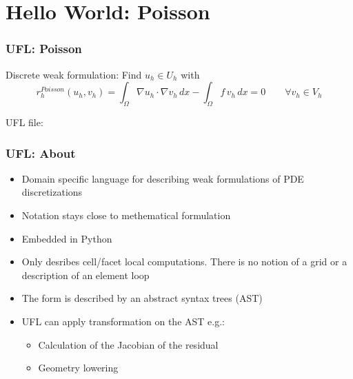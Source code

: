\documentclass[ignorenonframetext,11pt]{beamer}
\theoremstyle{definition}
\begin{document}
\section{Hello World: Poisson}

\begin{frame}
  \frametitle{UFL: Poisson}
  Discrete weak formulation: Find $u_h \in U_h$ with
  \begin{equation*}
    r_h^{Poisson}(u_h, v_h) = \int_\Omega \nabla u_h \cdot \nabla v_h \, dx
    - \int_\Omega f \, v_h \, dx = 0 \qquad \forall v_h \in V_h
  \end{equation*}

  UFL file:
  
\end{frame}

\begin{frame}
  \frametitle{UFL: About}
  \begin{itemize}
  \item Domain specific language for describing weak formulations of PDE
    discretizations
  \item Notation stays close to methematical formulation
  \item Embedded in Python
  \item Only desribes cell/facet local computations. There is no notion of a
    grid or a description of an element loop
  \item The form is described by an abstract syntax trees (AST)
  \item UFL can apply transformation on the AST e.g.:
    \begin{itemize}
    \item Calculation of the Jacobian of the residual
    \item Geometry lowering
    \end{itemize}
  \end{itemize}
\end{frame}
\end{document}
